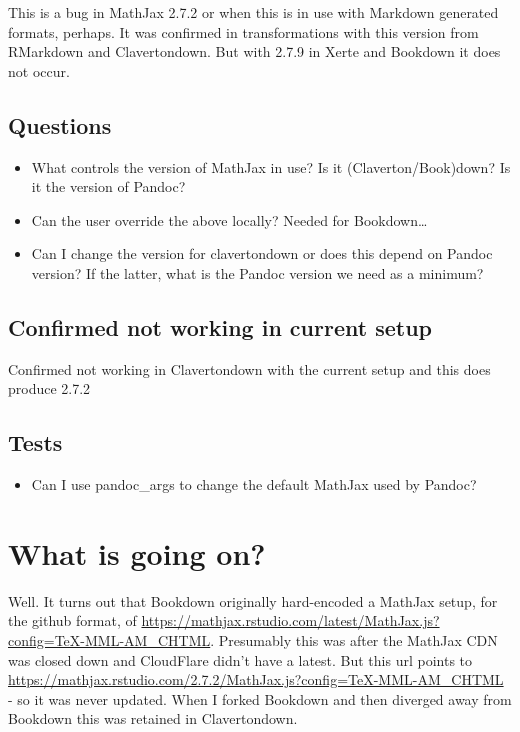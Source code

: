 \documentclass[
  12pt,
  a4paper]{extarticle}
\providecommand{\tightlist}{%
  \setlength{\itemsep}{0pt}\setlength{\parskip}{0pt}}
\renewcommand{\;}{\,}
\begin{document}
This is a bug in MathJax 2.7.2 or when this is in use with Markdown generated formats, perhaps. It was confirmed in transformations with this version from RMarkdown and Clavertondown. But with 2.7.9 in Xerte and Bookdown it does not occur.

\hypertarget{questions}{%
\subsection{Questions}\label{questions}}

\begin{itemize}
\tightlist
\item
  What controls the version of MathJax in use? Is it (Claverton/Book)down? Is it the version of Pandoc?
\item
  Can the user override the above locally? Needed for Bookdown\ldots{}
\item
  Can I change the version for clavertondown or does this depend on Pandoc version? If the latter, what is the Pandoc version we need as a minimum?
\end{itemize}

\hypertarget{confirmed-not-working-in-current-setup}{%
\subsection{Confirmed not working in current setup}\label{confirmed-not-working-in-current-setup}}

Confirmed not working in Clavertondown with the current setup and this does produce 2.7.2

\hypertarget{tests}{%
\subsection{Tests}\label{tests}}

\begin{itemize}
\tightlist
\item
  Can I use pandoc\_args to change the default MathJax used by Pandoc?
\end{itemize}

\hypertarget{what-is-going-on}{%
\section{What is going on?}\label{what-is-going-on}}

Well. It turns out that Bookdown originally hard-encoded a MathJax setup, for the github format, of \url{https://mathjax.rstudio.com/latest/MathJax.js?config=TeX-MML-AM_CHTML}. Presumably this was after the MathJax CDN was closed down and CloudFlare didn't have a latest. But this url points to \url{https://mathjax.rstudio.com/2.7.2/MathJax.js?config=TeX-MML-AM_CHTML} - so it was never updated. When I forked Bookdown and then diverged away from Bookdown this was retained in Clavertondown.
\end{document}
